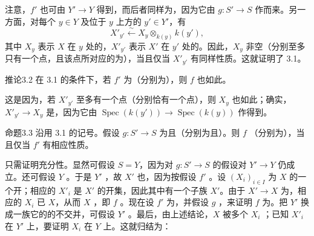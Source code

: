 注意，$f'$ 也可由 $Y'\to Y$ 得到，而后者同样为，因为它由 $g:S'\to S$ 作而来。另一方面，对每个 $y\in Y$ 及位于 $y$ 上方的 $y'\in Y'$，有
\[
X'_{y'}\xleftarrow{\sim}X_y\otimes_{k(y)}k(y'),
\]
其中 $X_y$ 表示 $X$ 在 $y$ 处的，$X'_{y'}$ 表示 $X'$ 在 $y'$ 处的。因此，$X_y$ 非空（分别至多只有一个点，且该点所对应的为），当且仅当 $X'_{y'}$ 有同样性质。这就证明了 3.1。

\begin{SGAresult}{推论}{3.2}
在 3.1 的条件下，若 $f'$ 为（分别为），则 $f$ 也如此。
\end{SGAresult}
这是因为，若 $X'_{y'}$ 至多有一个点（分别恰有一个点），则 $X_y$ 也如此；确实， $X'_{y'}\to X_y$ 是，因为它由 $\operatorname{Spec}(k(y'))\to\operatorname{Spec}(k(y))$ 作得到。

\begin{SGAresult}{命题}{3.3}
沿用 3.1 的记号。假设 $g:S'\to S$ 为且（分别为且）。则 $f$ （分别为），当且仅当 $f'$ 有相应性质。
\end{SGAresult}
只需证明充分性。显然可假设 $S=Y$，因为对 $g:S'\to S$ 的假设对 $Y'\to Y$ 仍成立。还可假设 $Y$ 。于是 $Y'$ ，故 $X'$ 也，因为按假设 $f'$ 。设 $(X_i)_{i\in I}$ 为 $X$ 的一个开；相应的 $X'_i$ 是 $X'$ 的开集，因此其中有一个子族 $X'$。由于 $X'\to X$ 为，相应的 $X_i$ 已 $X$，从而 $X$ ，即 $f$ 。现在设 $f'$ 为，并假设 $g$ ，来证明 $f$ 为。把 $Y'$ 换成一族它的的不交并，可假设 $Y'$ 。最后，由上述结论，$X$ 被多个 $X_i$ ；已知 $X'_i$ 在 $Y'$ 上，要证明 $X_i$ 在 $Y$ 上。这就归结为：

